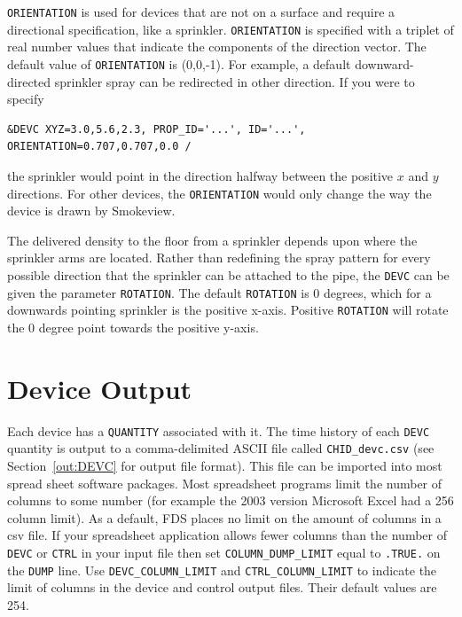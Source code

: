 \documentclass[11pt]{book}
\newcommand{\ct}{\tt\small}
\begin{document}
{\ct ORIENTATION} is used for devices that are not on a surface
and require a directional specification, like a sprinkler. {\ct ORIENTATION} is specified with a
triplet of real number values that indicate the components of the direction vector.
The default value of {\ct ORIENTATION} is (0,0,-1).
For example, a default downward-directed sprinkler spray can be redirected in other direction.
If you were to specify

\footnotesize
\begin{verbatim}
&DEVC XYZ=3.0,5.6,2.3, PROP_ID='...', ID='...', ORIENTATION=0.707,0.707,0.0 /
\end{verbatim}
\normalsize

\noindent
the sprinkler would point in the direction halfway between the positive $x$ and $y$ directions.
For other devices, the {\ct ORIENTATION} would only change the way the device is drawn by Smokeview.

The delivered density to the floor from a sprinkler depends upon where the sprinkler arms are located.  Rather than redefining the spray pattern for every possible direction that the sprinkler can be attached to the pipe, the {\ct DEVC} can be given the parameter {\ct ROTATION}.  The default {\ct ROTATION} is 0 degrees, which for a downwards pointing sprinkler is the positive x-axis.  Positive {\ct ROTATION} will rotate the 0 degree point towards the positive y-axis.

\section{Device Output}
\label{info:out:DEVC}

Each device has a {\ct QUANTITY} associated with it.
The time history of each {\ct DEVC} quantity is output to a comma-delimited
ASCII file called {\ct CHID\_devc.csv}
(see Section~\ref{out:DEVC} for output file format).
This file can be imported into most spread sheet software packages.  Most spreadsheet programs limit the number of columns to some number (for example the 2003 version Microsoft Excel had a 256 column limit).  As a default, FDS places no limit on the amount of columns in a csv file.  If your spreadsheet application allows fewer columns than the number of {\ct DEVC} or {\ct CTRL} in your input file then set {\ct COLUMN\_DUMP\_LIMIT} equal to {\ct .TRUE.} on the {\ct DUMP} line.
Use {\ct DEVC\_COLUMN\_LIMIT} and {\ct CTRL\_COLUMN\_LIMIT} to indicate the limit of columns in the
device and control output files. Their default values are 254.
\end{document}
